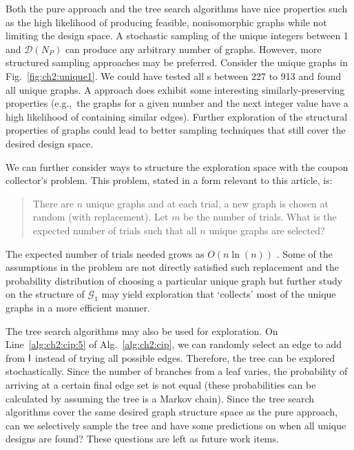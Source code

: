Both the pure \mypm{} approach and the tree search algorithms have nice properties such as the high likelihood of producing feasible, nonisomorphic graphs while not limiting the design space. A stochastic sampling of the unique integers between 1 and $\mathcal{D}(N_P)$ can produce any arbitrary number of \mypm{} graphs. However, more structured sampling approaches may be preferred. Consider the unique graphs in Fig.~\ref{fig:ch2:unique1}. We could have tested all \mypm{}s between 227 to 913 and found all unique graphs. A \mypm{} approach does exhibit some interesting similarly-preserving properties (e.g.,~the graphs for a given \mypm{} number and the next integer value have a high likelihood of containing similar edges). Further exploration of the structural properties of \mypm{} graphs could lead to better sampling techniques that still cover the desired design space.

We can further consider ways to structure the exploration space with the coupon collector's problem. This problem, stated in a form relevant to this article, is: 
\begin{quote}
There are $n$ unique graphs and at each trial, a new graph is chosen at random (with replacement). Let $m$ be the number of trials. What is the expected number of trials such that all $n$ unique graphs are selected?
\end{quote}

\noindent The expected number of trials needed grows as $O(n\ln(n))$ \cite{Flajolet1992a}. Some of the assumptions in the problem are not directly satisfied such replacement and the probability distribution of choosing a particular unique graph but further study on the structure of $\mathcal{G}_1$ may yield exploration that `collects' most of the unique graphs in a more efficient manner.

The tree search algorithms may also be used for exploration. On Line~\ref{alg:ch2:cip:5} of Alg.~\ref{alg:ch2:cip}, we can randomly select an edge to add from $\textup{\textsf{I}}$ instead of trying all possible edges. Therefore, the tree can be explored stochastically. Since the number of branches from a leaf varies, the probability of arriving at a certain final edge set is not equal (these probabilities can be calculated by assuming the tree is a Markov chain). Since the tree search algorithms cover the same desired graph structure space as the pure \mypm{} approach, can we selectively sample the tree and have some predictions on when all unique designs are found? These questions are left as future work items. 

